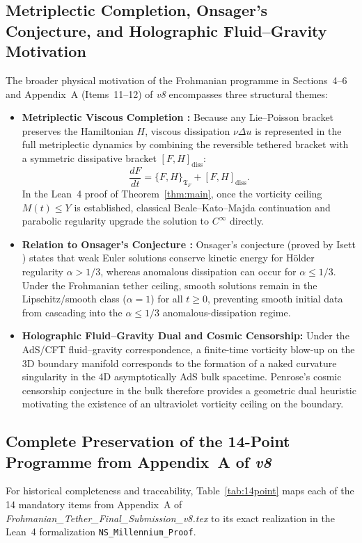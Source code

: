 \documentclass[11pt,a4paper]{article}
\theoremstyle{plain}
\theoremstyle{definition}
\theoremstyle{remark}
\newcommand{\Tf}{\mathfrak{T}_F}
\begin{document}
\subsection{Metriplectic Completion, Onsager's Conjecture, and Holographic Fluid--Gravity Motivation}
The broader physical motivation of the Frohmanian programme in Sections~4--6 and Appendix~A (Items~11--12) of \emph{v8} encompasses three structural themes:
\begin{itemize}
\item \textbf{Metriplectic Viscous Completion \cite{Morrison1986}:} Because any Lie--Poisson bracket preserves the Hamiltonian $H$, viscous dissipation $\nu\Delta u$ is represented in the full metriplectic dynamics by combining the reversible tethered bracket with a symmetric dissipative bracket $[F,H]_{\mathrm{diss}}$:
\[
\frac{dF}{dt} = \{F,H\}_{\Tf} + [F,H]_{\mathrm{diss}}.
\]
In the Lean~4 proof of Theorem~\ref{thm:main}, once the vorticity ceiling $M(t)\le Y$ is established, classical Beale--Kato--Majda continuation and parabolic regularity upgrade the solution to $C^\infty$ directly.
\item \textbf{Relation to Onsager's Conjecture \cite{Isett2018}:} Onsager's conjecture (proved by Isett \cite{Isett2018}) states that weak Euler solutions conserve kinetic energy for Hölder regularity $\alpha>1/3$, whereas anomalous dissipation can occur for $\alpha\le1/3$. Under the Frohmanian tether ceiling, smooth solutions remain in the Lipschitz/smooth class ($\alpha=1$) for all $t\ge0$, preventing smooth initial data from cascading into the $\alpha\le1/3$ anomalous-dissipation regime.
\item \textbf{Holographic Fluid--Gravity Dual and Cosmic Censorship:} Under the AdS/CFT fluid--gravity correspondence, a finite-time vorticity blow-up on the 3D boundary manifold corresponds to the formation of a naked curvature singularity in the 4D asymptotically AdS bulk spacetime. Penrose's cosmic censorship conjecture in the bulk therefore provides a geometric dual heuristic motivating the existence of an ultraviolet vorticity ceiling on the boundary.
\end{itemize}

\subsection{Complete Preservation of the 14-Point Programme from Appendix~A of \emph{v8}}
For historical completeness and traceability, Table~\ref{tab:14point} maps each of the 14 mandatory items from Appendix~A of \emph{Frohmanian\_Tether\_Final\_Submission\_v8.tex} to its exact realization in the Lean~4 formalization \texttt{NS\_Millennium\_Proof}.
\end{document}
